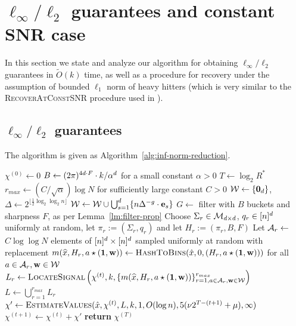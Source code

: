 \section{$\ell_\infty/\ell_2$ guarantees and constant SNR case}
In this section we state and analyze our algorithm for obtaining $\ell_\infty/\ell_2$ guarantees in $\tilde O(k)$ time, as well as a procedure for recovery under the assumption of bounded $\ell_1$ norm of heavy hitters (which is very similar to the \textsc{RecoverAtConstSNR} procedure used in \cite{IKP}).

\subsection{$\ell_\infty/\ell_2$ guarantees}\label{sec:linf}
The algorithm is given as Algorithm~\ref{alg:inf-norm-reduction}.

\begin{algorithm}
\caption{\textsc{ReduceInfNorm}($\hat x, \chi, k, \nu, R^*, \mu$)}\label{alg:inf-norm-reduction} 
\begin{algorithmic}[1] 
\State $\chi^{(0)} \gets 0$ 
\State $B\gets (2\pi)^{4d\cdot F}\cdot k/\alpha^d$ for a small constant $\alpha>0$
\State $T\gets \log_2 R^*$
\State $r_{max}\gets (C/\sqrt{\alpha})\log N$ for sufficiently large constant $C>0$
\State $\mathcal{W}\gets \{\mathbf{0}_d\}$, $\Delta\gets 2^{\lfloor \frac1{2}\log_2 \log_2 n\rfloor}$ 
\State $\mathcal{W}\gets \mathcal{W}\cup \bigcup_{s=1}^d \{n \Delta^{-g} \cdot \mathbf{e}_s\}$ 
\EndFor
\State $G\gets$ filter with $B$ buckets and sharpness $F$, as per Lemma~\ref{lm:filter-prop}
\State Choose $\Sigma_r\in \mathcal{M}_{d\times d}$, $q_r\in {[n]^d}$ uniformly at random, let $\pi_r:=(\Sigma_r, q_r)$ and let $H_r:=(\pi_r, B, F)$
\State Let ${\mathcal{A}}_r\gets $ $C\log\log N$ elements of ${[n]^d}\times {[n]^d}$ sampled uniformly at random with replacement
\For {$\h\in \H$}
\State $m(\wh{x}, H_r, a\star(\one, \h))\gets \Call{HashToBins}{\hat x, 0, (H_r, a\star (\one, \h))}$ for all $a\in {\mathcal{A}}_r, \mathbf{w}\in \mathcal{W}$
\EndFor
\EndFor
{} 
\State $L_r \gets \textsc{LocateSignal}\left(\chi^{(t)}, k, \{m(\widehat{x}, H_r, a\star (\mathbf{1}, \mathbf{w}))\}_{r=1, a\in {\mathcal{A}}_r, \mathbf{w}\in \mathcal{W}}^{r_{max}}\right)$
\EndFor
\State $L\gets \bigcup_{r=1}^{r_{max}} L_r$
\State $\chi' \gets \Call{EstimateValues}{\hat x,  \chi^{(t)}, L, k, 1, O(\log n), 5(\nu 2^{T-(t+1)}+\mu), \infty}$
\State $\chi^{(t+1)} \gets \chi^{(t)} + \chi'$
\EndFor
\State \textbf{return} $\chi^{(T)}$
\EndProcedure 
\end{algorithmic}
\end{algorithm}


